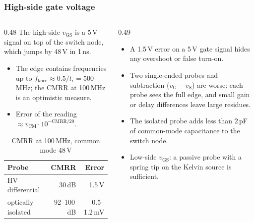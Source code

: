 \begin{frame}
	\frametitle{High-side gate voltage}
	\begin{columns}[T]
		\begin{column}{0.48\textwidth}
			\small
			The high-side $v_\mathrm{GS}$ is a 5\,V signal on top of the switch node, which jumps by 48\,V in 1\,ns.
			\begin{itemize}
				\item The edge contains frequencies up to $f_\mathrm{knee}\approx0.5/t_\mathrm{r}=500$\,MHz; the CMRR at 100\,MHz is an optimistic measure.
				\item Error of the reading $\approx v_\mathrm{CM}\cdot10^{-\mathrm{CMRR}/20}$.
			\end{itemize}
			\begin{table}
				\centering
				\footnotesize
				\begin{tabular}{|l|r|r|}
					\hline
					\textbf{Probe}       & \textbf{CMRR}  & \textbf{Error}  \\
					\hline
					HV differential      & 30\,dB         & 1.5\,V          \\
					optically isolated   & 92--100\,dB    & 0.5--1.2\,mV    \\
					\hline
				\end{tabular}
				\caption{CMRR at 100\,MHz, common mode 48\,V}
			\end{table}
		\end{column}
		\begin{column}{0.49\textwidth}
			\small
			\begin{itemize}
				\item A 1.5\,V error on a 5\,V gate signal hides any overshoot or false turn-on.
				\item Two single-ended probes and subtraction ($v_\mathrm{G}-v_\mathrm{S}$) are worse: each probe sees the full edge, and small gain or delay differences leave large residues.
				\item The isolated probe adds less than 2\,pF of common-mode capacitance to the switch node.
				\item Low-side $v_\mathrm{GS}$: a passive probe with a spring tip on the Kelvin source is sufficient.
			\end{itemize}
		\end{column}
	\end{columns}
\end{frame}

